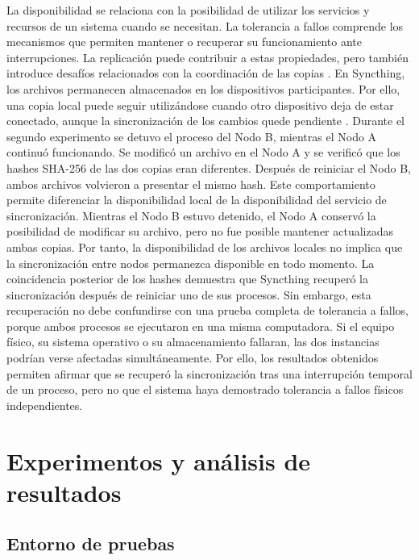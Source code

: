 \documentclass[12pt,a4paper]{article}
\begin{document}
La disponibilidad se relaciona con la posibilidad de utilizar los servicios 
y recursos de un sistema cuando se necesitan. La tolerancia a fallos comprende los mecanismos que permiten mantener o recuperar su funcionamiento ante interrupciones. La replicación puede contribuir a estas propiedades, pero también introduce desafíos relacionados con la coordinación de las copias \cite{vansteen2023,samimi2025}.
En Syncthing, los archivos permanecen almacenados en los dispositivos participantes. 
Por ello, una copia local puede seguir utilizándose cuando otro dispositivo deja de estar conectado, aunque la sincronización de los cambios quede pendiente \cite{syncthingFAQ,syncthingSyncing}.
Durante el segundo experimento se detuvo el proceso del Nodo B, mientras el Nodo A continuó funcionando. 
Se modificó un archivo en el Nodo A y se verificó que los hashes SHA-256 de las dos copias eran diferentes. Después de reiniciar el Nodo B, ambos archivos volvieron a presentar el mismo hash.
Este comportamiento permite diferenciar la disponibilidad local de la disponibilidad del servicio de sincronización. Mientras el Nodo B estuvo detenido, el Nodo A conservó la posibilidad de modificar su archivo, pero no fue posible mantener actualizadas ambas copias. Por tanto, la disponibilidad de los archivos locales no implica que la sincronización entre nodos permanezca disponible en todo momento.
La coincidencia posterior de los hashes demuestra que Syncthing recuperó la sincronización después de reiniciar 
uno de sus procesos. Sin embargo, esta recuperación no debe confundirse con una prueba completa de tolerancia a fallos, porque ambos procesos se ejecutaron en una misma computadora.
Si el equipo físico, su sistema operativo o su almacenamiento fallaran, las dos instancias podrían verse afectadas simultáneamente. Por ello, los resultados obtenidos permiten afirmar que se recuperó la sincronización tras una interrupción temporal de un proceso, pero no que el sistema haya demostrado tolerancia a fallos físicos independientes.

\section{Experimentos y análisis de resultados}

\subsection{Entorno de pruebas}
\end{document}
